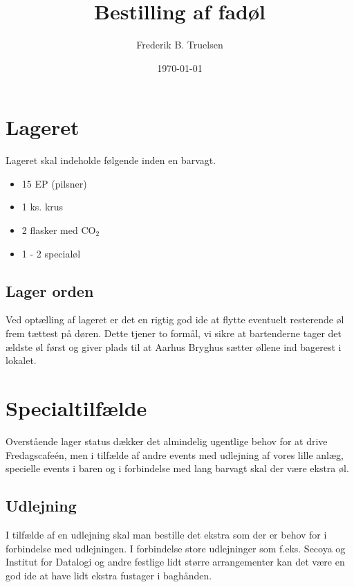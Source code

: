 

\title{Bestilling af fadøl}
\date{\today}
\author{Frederik B. Truelsen}



\maketitle

\section{Lageret}

Lageret skal indeholde følgende inden en barvagt.

\begin{itemize}
\item 15 EP (pilsner)
\item 1 ks. krus
\item 2 flasker med CO$_{2}$
\item 1 - 2 specialøl
\end{itemize} 

\subsection{Lager orden}

Ved optælling af lageret er det en rigtig god ide at flytte eventuelt resterende øl frem tættest på døren.
Dette tjener to formål, vi sikre at bartenderne tager det ældste øl først og giver plads til at Aarhus Bryghus
sætter øllene ind bagerest i lokalet.

\section{Specialtilfælde}

Overstående lager status dækker det almindelig ugentlige behov for at drive Fredagscafeén,
men i tilfælde af andre events med udlejning af vores lille anlæg, specielle events i baren og
i forbindelse med lang barvagt skal der være ekstra øl.

\subsection{Udlejning}

I tilfælde af en udlejning skal man bestille det ekstra som der er behov for i forbindelse med
udlejningen. I forbindelse store udlejninger som f.eks. Secoya og Institut for Datalogi og andre
festlige lidt større arrangementer  kan det være en god ide at have lidt ekstra fustager i baghånden.

